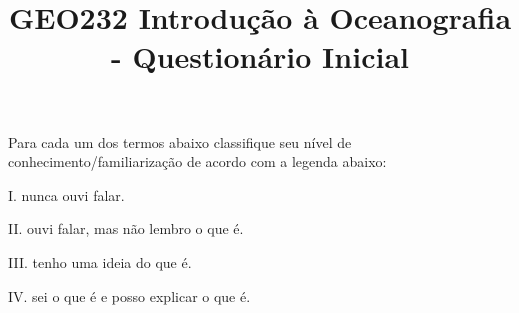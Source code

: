 \documentclass[a4paper,10pt]{article}
\title{GEO232 Introdução à Oceanografia - Questionário Inicial}
\author{\vspace{-10ex}}
\date{\vspace{-10ex}}
\begin{document}
  \maketitle
  \onehalfspace

% 

Para cada um dos termos abaixo classifique seu nível de conhecimento/familiarização de acordo com a legenda abaixo:

\begin{multicols}{2}

I. nunca ouvi falar.

II. ouvi falar, mas não lembro o que é.

III. tenho uma ideia do que é.

IV. sei o que é e posso explicar o que é.

\end{multicols}
\end{document}
